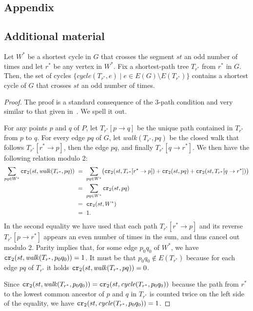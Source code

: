 \documentclass[a4paper,USenglish]{lipics}
\newcommand{\cycle}{\mathit{cycle}}
\newcommand{\walk}{\mathit{walk}}
\newcommand\CR{\mbox{\tt cr}_2}		  %
\begin{document}
\newpage
\begin{appendix}
\section{Appendix}
\label{appendix}

\subsection{Additional material}
\label{sec:3-path-condition}
\label{sec:FULLAlgorithm}

\begin{lemma}
	Let $W^*$ be a shortest cycle in $G$ that crosses the segment 
	$st$ an odd number of times and let $r^*$ be any vertex in $W^*$.
	Fix a shortest-path tree $T_{r^*}$ from $r^*$ in $G$.
	Then, the set of cycles $\{ \cycle(T_{r^*},e)\mid e\in E(G)\setminus E(T_{r^*})\}$
	contains a shortest cycle of $G$ that crosses $st$ an odd number of times.
\end{lemma}
\begin{proof}
	The proof is a standard consequence of the 3-path condition and 
	very similar to that given in~\cite{CG16}. We spell it out.
	
	For any points $p$ and $q$ of $P$, let $T_{r^*}[p \rightarrow q]$ be the 
	unique path contained in $T_{r^*}$ from $p$ to $q$.
	For every edge $pq$ of $G$, let $\walk(T_{r^*},pq)$ be the closed walk that follows 
	$T_{r^*}[r^*\rightarrow p]$, then the edge $pq$, and finally $T_{r^*}[q\rightarrow r^*]$.
	We then have the following relation modulo 2:
	\begin{align*}
		\sum_{pq\in W^*} \CR(st,\walk(T_{r^*},pq)) ~&=~ 
		\sum_{pq\in W^*} \bigl( \CR(st,T_{r^*}[r^* \rightarrow p])+ \CR(st,pq) + 
						\CR(st,T_{r^*}[q \rightarrow r^*]) \bigr) \\
		&=~ \sum_{pq\in W^*} \CR(st,pq)  \\
		&=~ \CR(st,W^*) \\
		&=~ 1. 		
	\end{align*}
	In the second equality we have used that each path
	$T_{r^*}[r^*\rightarrow p]$ and its reverse $T_{r^*}[p\rightarrow r^*]$ 
	appears an even number of times in the sum,
	and thus cancel out modulo 2.
	Parity implies that, for some edge $p_0q_0$ of $W^*$, 
	we have $\CR(st,\walk(T_{r^*},p_0q_0))=1$.
	It must be that $p_0q_0\notin E(T_{r^*})$ because for each edge $pq$ of $T_{r^*}$
	it holds $\CR(st,\walk(T_{r^*},pq))=0$.
	
	Since $\CR(st,\walk(T_{r^*},p_0q_0))= \CR(st,\cycle(T_{r^*},p_0q_0))$ 
	because the path from $r^*$ to the lowest common ancestor of $p$ and $q$ in $T_{r^*}$ 
	is counted twice on the left side of the equality, 
	we have $\CR(st,\cycle(T_{r^*},p_0q_0))=1$. 


\end{proof}
\end{appendix}
\end{document}
